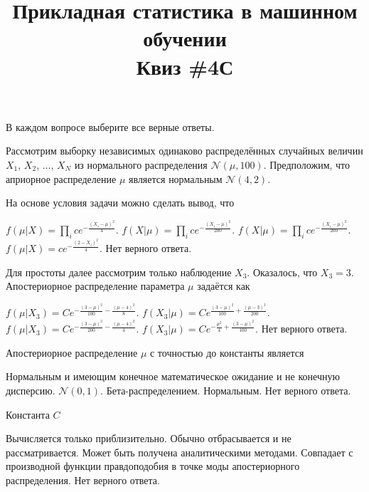 \documentclass[10pt, a4paper]{exam}
\title{{\normalsize Прикладная статистика в машинном обучении} \\ \vspace{0.5em} Квиз \#4С}
\author{\rule{15cm}{0.4pt}}
\begin{document}
	
	\maketitle
	
	\begin{center}
		В каждом вопросе выберите все верные ответы.
	\end{center}
	
	Рассмотрим выборку независимых одинаково распределённых случайных величин $X_1$, $X_2$, $\ldots$, $X_N$ из нормального распределения $\mathcal{N}(\mu, 100)$. Предположим, что априорное распределение $\mu$ является нормальным $\mathcal{N}(4, 2)$.
	
	\begin{questions}
		\question На основе условия задачи можно сделать вывод, что
		\begin{choices} 
			\choice $f(\mu | X) = \prod_i ce^{-\frac{(X_i - \mu)^2}{4}}$.
			\choice $f(X | \mu) = \prod_i ce^{-\frac{(X_i - \mu)^2}{200}}$.
			\choice $f(X | \mu) = \prod_i ce^{-\frac{(X_i - \mu)^2}{200}}$.
			\choice $f(\mu | X) = ce^{-\frac{(2 - X_i)^2}{4}}$.
			\choice Нет верного ответа.
		\end{choices}
	
		\question Для простоты далее рассмотрим только наблюдение $X_3$. Оказалось, что $X_3 = 3$. Апостериорное распределение параметра $\mu$ задаётся как
		\begin{choices}
			\choice $f(\mu | X_{3}) = Ce^{-\frac{(3 - \mu)^2}{100} - \frac{(\mu - 4)^2}{8}}$.
			\choice $f( X_{3} | \mu) = Ce^{\frac{(3 - \mu)^2}{100} + \frac{(\mu - 3)^2}{200}}$.
			\choice $f(\mu | X_{3}) = Ce^{-\frac{(3 - \mu)^2}{200} - \frac{(\mu - 4)^2}{4}}$.
			\choice $f(X_3 | \mu) = Ce^{-\frac{\mu^2}{4} + \frac{(3 - \mu)^2}{100}}$.
			\choice Нет верного ответа.
		\end{choices}
	
		\question Апостериорное распределение $\mu$ с точностью до константы является 
		\begin{choices}
			\choice Нормальным и имеющим конечное математическое ожидание и не конечную дисперсию.
			\choice $\mathcal{N}(0, 1)$.
			\choice Бета-распределением.
			\choice Нормальным. 
			\choice Нет верного ответа.
		\end{choices}
		
		\question Константа $C$
		\begin{choices}
			\choice Вычисляется только приблизительно.
			\choice Обычно отбрасывается и не рассматривается.
			\choice Может быть получена аналитическими методами.
			\choice Совпадает с производной функции правдоподобия в точке моды апостериорного распределения.
			\choice Нет верного ответа.
		\end{choices}
	

\end{questions}
\end{document}
